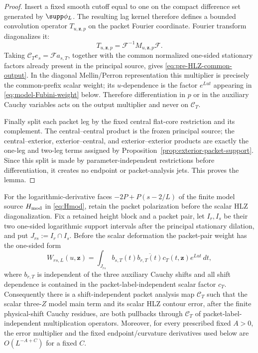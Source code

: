 \begin{proof}
Insert a fixed smooth cutoff equal to one on the compact difference set
generated by $\supp\phi_L$.  The resulting lag kernel therefore defines a
bounded convolution operator $T_{u,\mathbf z,p}$ on the packet Fourier coordinate.
Fourier transform diagonalizes it:
\[
T_{u,\mathbf z,p}=\mathcal F^{-1}M_{u,\mathbf z,p}\mathcal F.
\]
Taking $\mathscr C_Te_s=\mathcal F a_{s,T}$, together with the common normalized
one-sided stationary factors already present in the principal source, gives
\eqref{eq:pre-HLZ-common-output}.  In the diagonal Mellin/Perron representation
this multiplier is precisely the common-prefix scalar weight; its $u$-dependence
is the factor $e^{Lut}$ appearing in \eqref{eq:model-Fubini-weight} below.
Therefore differentiation in $p$ or in the auxiliary Cauchy variables acts on
the output multiplier and never on $\mathscr C_T$.

Finally split each packet leg by the fixed central flat-core restriction and
its complement.  The central--central product is the frozen principal source;
the central--exterior, exterior--central, and exterior--exterior products are
exactly the one-leg and two-leg terms assigned by
Proposition~\ref{prop:exterior-packet-support}.  Since this split is made by
parameter-independent restrictions before differentiation, it creates no
endpoint or packet-analysis jets.  This proves the lemma.
\end{proof}

\begin{lemma}
\label{lem:model-HLZ-Fubini-lift}
For the logarithmic-derivative faces $-2P+P(s-2/L)$ of the finite model source
$H_{\rm mod}$ in \eqref{eq:Hmod}, retain the packet polarization before the
scalar HLZ diagonalization.  Fix a retained height block and a packet pair, let
$I_r,I_s$ be their two one-sided logarithmic support intervals after the
principal stationary dilation, and put $J_{rs}:=I_r\cap I_s$.  Before the
scalar deformation the packet-pair weight has the one-sided form
\begin{equation}
\boxed{
W_{rs,L}(u,\mathbf z)
=\int_{J_{rs}} b_{s,T}(t)\overline{b_{r,T}(t)}
 c_T(t,\mathbf z)e^{Lut}\,dt,
}
\label{eq:model-Fubini-weight}
\end{equation}
where $b_{r,T}$ is independent of the three auxiliary Cauchy shifts and all
shift dependence is contained in the packet-label-independent scalar factor
$c_T$. Consequently there is a shift-independent packet analysis map
$\mathscr C_T$ such that the scalar three-$Z$ model main term and its scalar HLZ
contour error, after the finite physical-shift Cauchy residues, are both
pullbacks through $\mathscr C_T$ of packet-label-independent multiplication
operators.
Moreover, for every prescribed fixed $A>0$, the error multiplier and the fixed
endpoint/curvature derivatives used below are $O(L^{-A+C})$ for a fixed $C$.
\end{lemma}


